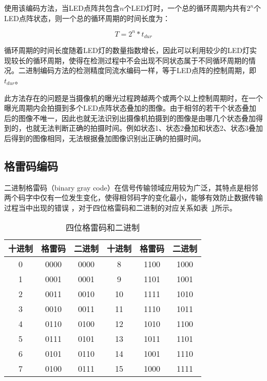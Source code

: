 使用该编码方法，当LED点阵共包含$n$个LED灯时，一个总的循环周期内共有$2^n$个LED点阵状态，则一个总的循环周期的时间长度为：

\begin{equation}
T = 2^n * t_{dur}
\end{equation}

循环周期的时间长度随着LED灯的数量指数增长，因此可以利用较少的LED灯实现较长的循环周期，使得在检测过程中不会出现不同状态属于不同循环周期的情况。二进制编码方法的检测精度同流水编码一样，等于LED点阵的控制周期，即$t_{dur}$。

此方法存在的问题是当摄像机的曝光过程跨越两个或两个以上控制周期时，在一个曝光周期内会拍摄到多个LED点阵状态叠加的图像。由于相邻的若干个状态叠加后的图像不唯一，因此也就无法识别出摄像机拍摄到的图像是由哪几个状态叠加得到的，也就无法判断正确的拍摄时间。例如状态1、状态2叠加和状态2、状态3叠加后得到的图像相同，无法根据叠加图像识别出正确的拍摄时间。

\subsection{格雷码编码}

二进制格雷码（binary gray code）在信号传输领域应用较为广泛，其特点是相邻两个码字中仅有一位发生变化，使得相邻码字的变化最小，能够有效防止数据传输过程当中出现的错误 \cite{mehta1996some, bitner1976efficient}，对于四位格雷码和二进制的对应关系如表~\ref{grayT}所示。

\begin{table}[h]
  \centering
  \caption{四位格雷码和二进制} 
  \label{grayT}
  \begin{tabular}{|c|c|c|c|c|c|}\hline
  十进制 & 格雷码 & 二进制 & 十进制 & 格雷码 & 二进制 \\ \hline
  0 & 0000 & 0000 & 8 & 1100 & 1000 \\ \hline
  1 & 0001 & 0001 & 9 & 1101 & 1001 \\ \hline
  2 & 0011 & 0010 & 10 & 1111 & 1010 \\ \hline
  3 & 0010 & 0011 & 11 & 1110 & 1011 \\ \hline
  4 & 0110 & 0100 & 12 & 1010 & 1100 \\ \hline
  5 & 0111 & 0101 & 13 & 1011 & 1101 \\ \hline
  6 & 0101 & 0110 & 14 & 1001 & 1110 \\ \hline
  7 & 0100 & 0111 & 15 & 1000 & 1111 \\ \hline
  \end{tabular}
\end{table}

